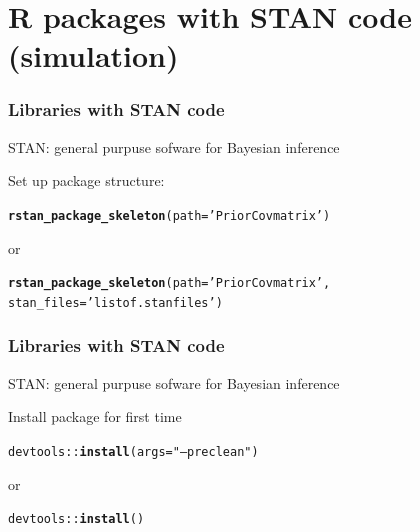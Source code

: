\documentclass[9pt]{beamer}\usepackage[]{graphicx}\usepackage[]{color}
\makeatletter
\newcommand{\hlstr}[1]{\textcolor[rgb]{0.192,0.494,0.8}{#1}}%
\newcommand{\hlopt}[1]{\textcolor[rgb]{0,0,0}{#1}}%
\newcommand{\hlstd}[1]{\textcolor[rgb]{0.345,0.345,0.345}{#1}}%
\newcommand{\hlkwc}[1]{\textcolor[rgb]{0.333,0.667,0.333}{#1}}%
\newcommand{\hlkwd}[1]{\textcolor[rgb]{0.737,0.353,0.396}{\textbf{#1}}}%
\newenvironment{kframe}{%
 \def\at@end@of@kframe{}%
 \ifinner\ifhmode%
  \def\at@end@of@kframe{\end{minipage}}%
  \begin{minipage}{\columnwidth}%
 \fi\fi%
 \def\FrameCommand##1{\hskip\@totalleftmargin \hskip-\fboxsep
 \colorbox{shadecolor}{##1}\hskip-\fboxsep
     \hskip-\linewidth \hskip-\@totalleftmargin \hskip\columnwidth}%
 \MakeFramed {\advance\hsize-\width
   \@totalleftmargin\z@ \linewidth\hsize
   \@setminipage}}%
 {\par\unskip\endMakeFramed%
 \at@end@of@kframe}
\newenvironment{knitrout}{}{} %
\makeatother
\begin{document}
\section{R packages with STAN code (simulation) }

\begin{frame}[fragile]
\frametitle{Libraries with STAN code}

STAN: general purpuse sofware for Bayesian inference
\vspace{1cm} 

Set up package structure:
\begin{knitrout}
\color{fgcolor}\begin{kframe}
\begin{alltt}
\hlkwd{rstan_package_skeleton}\hlstd{(}\hlkwc{path} \hlstd{=} \hlstr{'PriorCovmatrix'}\hlstd{)}
\end{alltt}
\end{kframe}
\end{knitrout}

or
\begin{knitrout}
\color{fgcolor}\begin{kframe}
\begin{alltt}
\hlkwd{rstan_package_skeleton}\hlstd{(}\hlkwc{path} \hlstd{=} \hlstr{'PriorCovmatrix'}\hlstd{,}
                       \hlkwc{stan_files} \hlstd{=}\hlstr{'list of .stan files'}\hlstd{)}
\end{alltt}
\end{kframe}
\end{knitrout}
\end{frame}

\begin{frame}[fragile]
\frametitle{Libraries with STAN code}

STAN: general purpuse sofware for Bayesian inference
\vspace{1cm}

Install package for first time
\begin{knitrout}
\color{fgcolor}\begin{kframe}
\begin{alltt}
\hlstd{devtools}\hlopt{::}\hlkwd{install}\hlstd{(}\hlkwc{args} \hlstd{=} \hlstr{"--preclean"}\hlstd{)}
\end{alltt}
\end{kframe}
\end{knitrout}

or
\begin{knitrout}
\color{fgcolor}\begin{kframe}
\begin{alltt}
\hlstd{devtools}\hlopt{::}\hlkwd{install}\hlstd{()}
\end{alltt}
\end{kframe}
\end{knitrout}
\end{frame}
\end{document}
